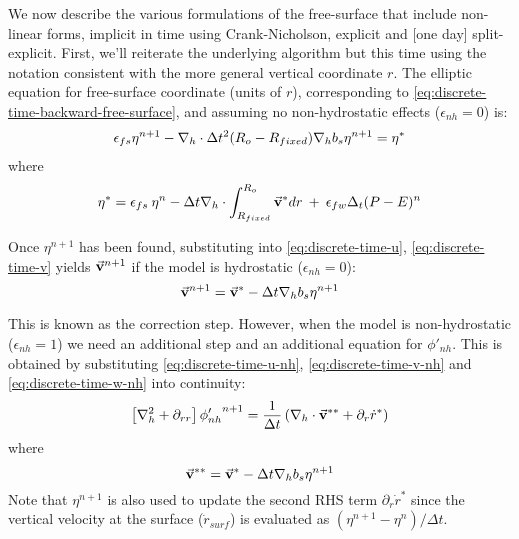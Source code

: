 We now describe the various formulations of the free-surface that
include non-linear forms, implicit in time using Crank-Nicholson,
explicit and [one day] split-explicit. First, we'll reiterate the
underlying algorithm but this time using the notation consistent with
the more general vertical coordinate $r$. The elliptic equation for
free-surface coordinate (units of $r$), corresponding to
\ref{eq:discrete-time-backward-free-surface}, and
assuming no non-hydrostatic effects ($\epsilon_{nh} = 0$) is:
\begin{eqnarray}
\epsilon_{fs} {\eta}^{n+1} -
{\bf \nabla}_h \cdot \Delta t^2 (R_o-R_{fixed}) {\bf \nabla}_h b_s
{\eta}^{n+1} = {\eta}^*
\label{eq-solve2D}
\end{eqnarray}
where
\begin{eqnarray}
{\eta}^* = \epsilon_{fs} \: {\eta}^{n} -
\Delta t {\bf \nabla}_h \cdot \int_{R_{fixed}}^{R_o} \vec{\bf v}^* dr
\: + \: \epsilon_{fw} \Delta_t (P-E)^{n} 
\label{eq-solve2D_rhs}
\end{eqnarray}



Once ${\eta}^{n+1}$ has been found, substituting into
\ref{eq:discrete-time-u}, \ref{eq:discrete-time-v} yields $\vec{\bf v}^{n+1}$ 
if the model is hydrostatic ($\epsilon_{nh}=0$):
$$
\vec{\bf v}^{n+1} = \vec{\bf v}^{*}
- \Delta t {\bf \nabla}_h b_s {\eta}^{n+1}
$$

This is known as the correction step. However, when the model is
non-hydrostatic ($\epsilon_{nh}=1$) we need an additional step and an
additional equation for $\phi'_{nh}$. This is obtained by substituting
\ref{eq:discrete-time-u-nh}, \ref{eq:discrete-time-v-nh} and \ref{eq:discrete-time-w-nh}
into continuity:
\begin{equation}
\left[ {\bf \nabla}_h^2 + \partial_{rr} \right] {\phi'_{nh}}^{n+1}
= \frac{1}{\Delta t} \left(
{\bf \nabla}_h \cdot \vec{\bf v}^{**} + \partial_r \dot{r}^* \right)
\end{equation}
where
\begin{displaymath}
\vec{\bf v}^{**} = \vec{\bf v}^* - \Delta t {\bf \nabla}_h b_s {\eta}^{n+1}
\end{displaymath}
Note that $\eta^{n+1}$ is also used to update the second RHS term
$\partial_r \dot{r}^* $ since
the vertical velocity at the surface ($\dot{r}_{surf}$) 
is evaluated as $(\eta^{n+1} - \eta^n) / \Delta t$.


